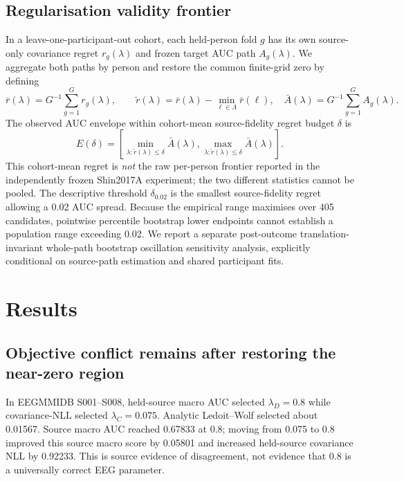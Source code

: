 \documentclass[11pt,a4paper]{article}
\begin{document}


\subsection{Regularisation validity frontier}
In a leave-one-participant-out cohort, each held-person fold \(g\) has
its own source-only covariance regret \(r_g(\lambda)\) and frozen target
AUC path \(A_g(\lambda)\). We aggregate both paths by person and restore
the common finite-grid zero by defining
\[
 \bar r(\lambda)=G^{-1}\sum_{g=1}^{G}r_g(\lambda),\qquad
 \widetilde r(\lambda)=\bar r(\lambda)-\min_{\ell\in\Lambda}\bar r(\ell),
 \quad \bar A(\lambda)=G^{-1}\sum_{g=1}^{G}A_g(\lambda).
\]
The observed AUC envelope within cohort-mean source-fidelity
regret budget \(\delta\) is
\[
 E(\delta)=
 \left[
 \min_{\lambda:\widetilde r(\lambda)\le\delta}\bar A(\lambda),
 \max_{\lambda:\widetilde r(\lambda)\le\delta}\bar A(\lambda)
 \right].
\]
This cohort-mean regret is \emph{not} the raw per-person frontier
reported in the independently frozen Shin2017A experiment; the two
different statistics cannot be pooled.
The descriptive threshold \(\delta_{0.02}\) is the smallest source-fidelity
regret allowing a 0.02 AUC spread. Because the empirical range
maximises over 405 candidates, pointwise percentile bootstrap lower
endpoints cannot establish a population range exceeding 0.02. We report
a separate post-outcome translation-invariant whole-path bootstrap
oscillation sensitivity analysis, explicitly conditional on source-path
estimation and shared participant fits.

\section{Results}
\subsection{Objective conflict remains after restoring the near-zero region}
In EEGMMIDB S001--S008, held-source macro AUC selected
\(\lambda_D=0.8\) while covariance-NLL selected \(\lambda_C=0.075\).
Analytic Ledoit--Wolf selected about 0.01567. Source macro AUC reached
0.67833 at 0.8; moving from 0.075 to 0.8 improved this source macro
score by 0.05801 and increased held-source covariance NLL by 0.92233.
This is source evidence of disagreement, not evidence that 0.8 is a
universally correct EEG parameter.
\end{document}
